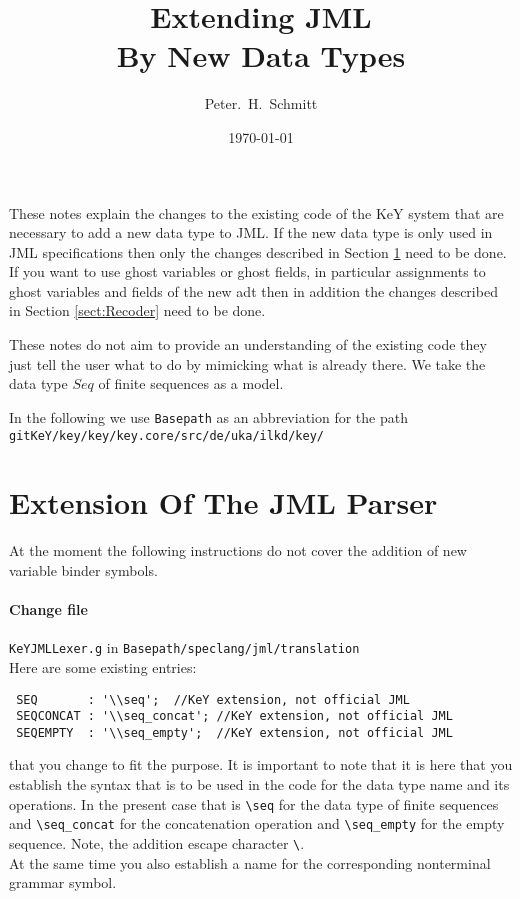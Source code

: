 \documentclass[11pt]{article}
\title{Extending JML\\By New Data Types}\date{\today}
\author{Peter.~H.~Schmitt}
\begin{document}
\maketitle

These notes explain the changes to the existing code of the KeY system that are necessary to add a new data type to JML.
If the new data type is only used in JML specifications then only the changes described in Section
\ref{sect:JML} need to be done. 
If you want to use ghost variables or ghost fields, in particular assignments to ghost variables and fields 
of the new adt then in addition the changes  described in Section
\ref{sect:Recoder} need to be done. 

These notes do not aim to provide an understanding of the existing code they just tell the user what to do by mimicking
what is already there. We take the data type $Seq$ of finite sequences as a model.

In the following we use \verb+Basepath+ as an abbreviation for the path\\[5pt]
\verb+gitKeY/key/key/key.core/src/de/uka/ilkd/key/+

\section{Extension Of  The JML Parser}
\label{sect:JML}

At the moment the following instructions do not cover the addition of new variable binder symbols.

\paragraph{Change file} \verb+KeYJMLLexer.g+ in \verb+Basepath/speclang/jml/translation+\\
Here are some existing entries:
\begin{verbatim}
 SEQ       : '\\seq';  //KeY extension, not official JML
 SEQCONCAT : '\\seq_concat'; //KeY extension, not official JML
 SEQEMPTY  : '\\seq_empty';  //KeY extension, not official JML
\end{verbatim}
that you change to fit the purpose. It is important to note that it is here that you establish
the syntax that is to be used in the code for the data type name and its operations. In the present case that is 
\verb+\seq+ for the data type of finite sequences and \verb+\seq_concat+ for the concatenation operation and
  \verb+\seq_empty+ for the empty sequence. Note, the addition escape character \verb+\+.\\
At the same time you also establish a name for the corresponding nonterminal grammar symbol. 
\end{document}
